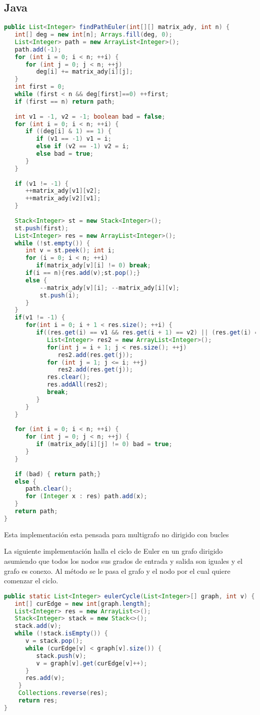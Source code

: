 \subsection{Java}
\begin{lstlisting}[language=Java]
public List<Integer> findPathEuler(int[][] matrix_ady, int n) {
   int[] deg = new int[n]; Arrays.fill(deg, 0);
   List<Integer> path = new ArrayList<Integer>();
   path.add(-1);
   for (int i = 0; i < n; ++i) {
      for (int j = 0; j < n; ++j)
         deg[i] += matrix_ady[i][j];
   }
   int first = 0;
   while (first < n && deg[first]==0) ++first;
   if (first == n) return path;
	
   int v1 = -1, v2 = -1; boolean bad = false;
   for (int i = 0; i < n; ++i) {
      if ((deg[i] & 1) == 1) {
         if (v1 == -1) v1 = i;
         else if (v2 == -1) v2 = i;
         else bad = true;
      }
   }
	
   if (v1 != -1) {
      ++matrix_ady[v1][v2];
      ++matrix_ady[v2][v1];
   }
	
   Stack<Integer> st = new Stack<Integer>();
   st.push(first);
   List<Integer> res = new ArrayList<Integer>();
   while (!st.empty()) {
      int v = st.peek(); int i;
      for (i = 0; i < n; ++i)
         if(matrix_ady[v][i] != 0) break;
      if(i == n){res.add(v);st.pop();}
      else {
          --matrix_ady[v][i]; --matrix_ady[i][v];
          st.push(i);
      }
   }
   if(v1 != -1) {
      for(int i = 0; i + 1 < res.size(); ++i) {
         if((res.get(i) == v1 && res.get(i + 1) == v2) || (res.get(i) == v2 && res.get(i + 1) == v1)) {
            List<Integer> res2 = new ArrayList<Integer>();
            for(int j = i + 1; j < res.size(); ++j)
               res2.add(res.get(j));
            for (int j = 1; j <= i; ++j)
               res2.add(res.get(j));
            res.clear();
            res.addAll(res2);
            break;
         }
      }
   }
	
   for (int i = 0; i < n; ++i) {
      for (int j = 0; j < n; ++j) {
         if (matrix_ady[i][j] != 0) bad = true;
      }
   }
	
   if (bad) { return path;}
   else {
      path.clear();
      for (Integer x : res) path.add(x);
   }
   return path;
}
\end{lstlisting}
Esta implementación esta pensada para multigrafo no dirigido con bucles


La siguiente implementación  halla el ciclo de Euler en un grafo dirigido asumiendo que todos los nodos sus grados de entrada y salida son iguales y el grafo es conexo. Al método se le pasa el grafo y el nodo por el cual quiere comenzar el ciclo.

\begin{lstlisting}[language=Java]
public static List<Integer> eulerCycle(List<Integer>[] graph, int v) {
   int[] curEdge = new int[graph.length];
   List<Integer> res = new ArrayList<>();
   Stack<Integer> stack = new Stack<>();
   stack.add(v);
   while (!stack.isEmpty()) {
      v = stack.pop();
      while (curEdge[v] < graph[v].size()) {
         stack.push(v);
         v = graph[v].get(curEdge[v]++);
      }
      res.add(v);
    }
    Collections.reverse(res);
    return res;
}
\end{lstlisting}